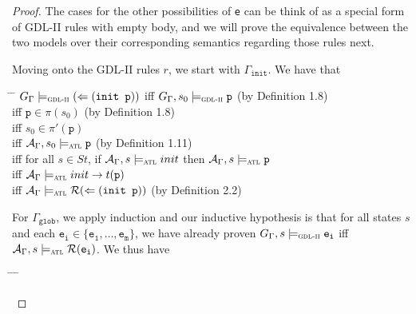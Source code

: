 \documentclass{article}
\theoremstyle{theorem}
\theoremstyle{lemma}
\theoremstyle{definition}
\theoremstyle{remark}
\begin{document}
\begin{proof}
    The cases for the other possibilities of \texttt{e} can be think of as a special form of GDL-II rules with empty body, and we will prove the equivalence between the two models over their corresponding semantics regarding those rules next.
    \par Moving onto the GDL-II rules $r$, we start with $\Gamma_\texttt{init}$. We have that
    \begin{tabbing}
    \hspace{1.2cm} \= \hspace{4cm} \= \kill
    \> $G_\Gamma \models_\textsc{gdl-ii} (\Leftarrow (\texttt{init p}))$ \> iff $G_\Gamma, s_0 \models_\textsc{gdl-ii} \texttt{p}$ (by Definition 1.8) \\
    \>\> iff $\texttt{p} \in \pi(s_0)$ (by Definition 1.8) \\
    \>\> iff $s_0 \in \pi'(\texttt{p})$ \\
    \>\> iff  $\mathcal{A}_\Gamma,s_0 \models_\textsc{atl} \texttt{p}$ (by Definition 1.11) \\
    \>\> iff for all $s \in St$, if $\mathcal{A}_\Gamma,s \models_\textsc{atl} init$ then $\mathcal{A}_\Gamma, s \models_\textsc{atl} \texttt{p}$ \\
    \>\> iff  $\mathcal{A}_\Gamma \models_\textsc{atl} init \rightarrow t(\texttt{p})$ \\
    \>\> iff  $\mathcal{A}_\Gamma \models_\textsc{atl} \mathcal{R}(\Leftarrow (\texttt{init p}))$ (by Definition 2.2)
    \end{tabbing}
    \par For $\Gamma_\texttt{glob}$, we apply induction and our inductive hypothesis is that for all states $s$ and each $\texttt{e}_\texttt{i} \in \{\texttt{e}_\texttt{1}, \ldots, \texttt{e}_\texttt{m}\}$, we have already proven $G_\Gamma,s \models_\textsc{gdl-ii} \texttt{e}_\texttt{i}$ iff $\mathcal{A}_\Gamma,s \models_\textsc{atl} \mathcal{R}(\texttt{e}_\texttt{i})$. We thus have
    \begin{tabbing}
    \hspace{1.2cm} \= \hspace{1cm} \= \hspace{0.5cm} \= \kill

\end{tabbing}
\end{proof}
\end{document}
